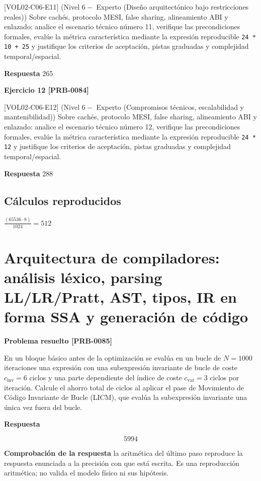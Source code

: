 \documentclass{book}
\begin{document}
[VOL02-C06-E11] (Nivel \(6 -\) Experto (Diseño arquitectónico bajo restricciones reales)) Sobre cachés, protocolo MESI, false sharing, alineamiento ABI y enlazado: analice el escenario técnico número 11, verifique las precondiciones formales, evalúe la métrica característica mediante la expresión reproducible \texttt{24 * 10 + 25} y justifique los criterios de aceptación, pistas graduadas y complejidad temporal/espacial.

\noindent\textbf{Respuesta} 265

\noindent\textbf{Ejercicio 12 [PRB-0084]}

[VOL02-C06-E12] (Nivel \(6 -\) Experto (Compromisos técnicos, escalabilidad y mantenibilidad)) Sobre cachés, protocolo MESI, false sharing, alineamiento ABI y enlazado: analice el escenario técnico número 12, verifique las precondiciones formales, evalúe la métrica característica mediante la expresión reproducible \texttt{24 * 12} y justifique los criterios de aceptación, pistas graduadas y complejidad temporal/espacial.

\noindent\textbf{Respuesta} 288

\subsection*{Cálculos reproducidos}

\(\frac{\left(65536\cdot 8\right)}{1024} = 512\)

\section{Arquitectura de compiladores: análisis léxico, parsing LL/LR/Pratt, AST, tipos, IR en forma SSA y generación de código}

\noindent\textbf{Problema resuelto [PRB-0085]}

En un bloque básico antes de la optimización se evalúa en un bucle de \(N = 1000\) iteraciones una expresión con una subexpresión invariante de bucle de coste \(c_{\text{inv}} = 6\) ciclos y una parte dependiente del índice de coste \(c_{\text{var}} = 3\) ciclos por iteración. Calcule el ahorro total de ciclos al aplicar el pase de Movimiento de Código Invariante de Bucle (LICM), que evalúa la subexpresión invariante una única vez fuera del bucle.

\noindent\textbf{Respuesta}

\[
5994
\]

\noindent\textbf{Comprobación de la respuesta} la aritmética del último paso reproduce la respuesta enunciada a la precisión con que está escrita. Es una reproducción aritmética; no valida el modelo físico ni sus hipótesis.
\end{document}
